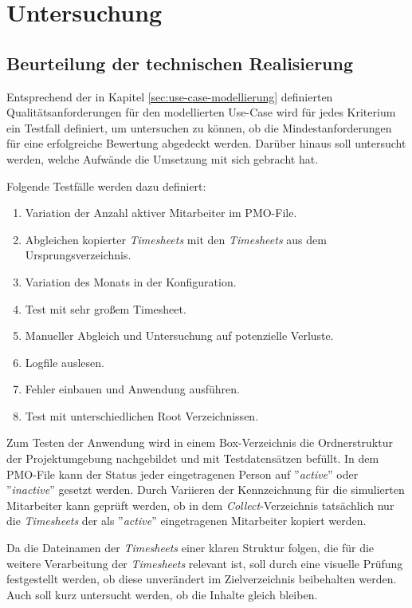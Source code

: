 \chapter{Untersuchung}
\label{chap:untersuchung}

\section{Beurteilung der technischen Realisierung}
Entsprechend der in Kapitel \ref{sec:use-case-modellierung} definierten Qualitätsanforderungen für den modellierten Use-Case wird für jedes Kriterium ein Testfall definiert, um untersuchen zu können, ob die Mindestanforderungen für eine erfolgreiche Bewertung abgedeckt werden. Darüber hinaus soll untersucht werden, welche Aufwände die Umsetzung mit sich gebracht hat.

Folgende Testfälle werden dazu definiert:
\begin{enumerate}
    \item Variation der Anzahl aktiver Mitarbeiter im PMO-File.
    \item Abgleichen kopierter \textit{\glspl{Timesheet}} mit den \textit{\glspl{Timesheet}} aus dem Ursprungsverzeichnis.
    \item Variation des Monats in der Konfiguration.
    \item Test mit sehr großem Timesheet.
    \item Manueller Abgleich und Untersuchung auf potenzielle Verluste.
    \item Logfile auslesen.
    \item Fehler einbauen und Anwendung ausführen.
    \item Test mit unterschiedlichen Root Verzeichnissen.
\end{enumerate}

Zum Testen der Anwendung wird in einem \gls{Box}-Verzeichnis die Ordnerstruktur der Projektumgebung nachgebildet und mit Testdatensätzen befüllt. In dem PMO-File kann der Status jeder eingetragenen Person auf ''\textit{active}'' oder ''\textit{inactive}'' gesetzt werden. Durch Variieren der Kennzeichnung für die simulierten Mitarbeiter kann geprüft werden, ob in dem \textit{Collect}-Verzeichnis tatsächlich nur die \textit{\glspl{Timesheet}} der als ''\textit{active}'' eingetragenen Mitarbeiter kopiert werden.

Da die Dateinamen der \textit{\glspl{Timesheet}} einer klaren Struktur folgen, die für die weitere Verarbeitung der \textit{\glspl{Timesheet}} relevant ist, soll durch eine visuelle Prüfung festgestellt werden, ob diese unverändert im Zielverzeichnis beibehalten werden. Auch soll kurz untersucht werden, ob die Inhalte gleich bleiben.

